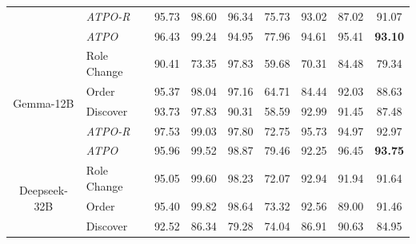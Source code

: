 \begin{table}[t!]
{\begin{tabular}{|c|l|ccccccc|}
                             &   \textit{ATPO-R}  &   95.73  &   98.60  &   96.34  &   75.73  &   93.02  &   87.02  &   \multicolumn{1}{|c|}{91.07}  \\ 
                            &   \textit{ATPO}  &   96.43  &  99.24  &   94.95  &  77.96  &  94.61  &   95.41  &  \multicolumn{1}{|c|}{\textbf{93.10}}  \\  \hline
\multirow{5}{*}{Gemma-12B}     &  Role Change &   90.41  &   73.35  &   97.83  &   59.68  &   70.31  &   84.48  &   \multicolumn{1}{|c|}{79.34}  \\
                             &  Order &   95.37  &   98.04  &   97.16  &   64.71  &   84.44  &   92.03  &   \multicolumn{1}{|c|}{88.63}  \\ 
                             &  Discover &   93.73  &   97.83  &   90.31  &   58.59  &   92.99  &   91.45  &   \multicolumn{1}{|c|}{87.48}  \\ %
                             &   \textit{ATPO-R}  &   97.53  &   99.03  &   97.80  &   72.75  &   95.73  &   94.97  &   \multicolumn{1}{|c|}{92.97}  \\ 
                            &   \textit{ATPO}  &   95.96  &  99.52  &   98.87  &  79.46  &  92.25  &   96.45  &  \multicolumn{1}{|c|}{\textbf{93.75}}  \\  \hline
\multirow{5}{*}{Deepseek-32B} &  Role Change &   95.05  &  99.60  &   98.23  &   72.07  &   92.94  &   91.94  &   \multicolumn{1}{|c|}{91.64}  \\ 
                             &  Order &   95.40  &   99.82  &   98.64  &   73.32  &   92.56  &   89.00  &   \multicolumn{1}{|c|}{91.46}  \\ 
                             &  Discover &   92.52  &   86.34  &   79.28  &   74.04  &   86.91  &   90.63  &   \multicolumn{1}{|c|}{84.95}  \\ %

\end{tabular}}
\end{table}
